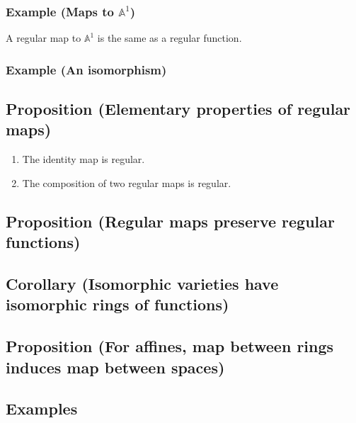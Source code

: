 \documentclass[11pt]{article}
\begin{document}
\subsubsection{Example (Maps to \(\mathbb A^1\))}
\label{sec:org48bd03f}
A regular map to \(\mathbb A^1\) is the same as a regular function.

\subsubsection{Example (An isomorphism)}
\label{sec:org9f56cb3}




\subsection{Proposition (Elementary properties of regular maps)}
\label{sec:org328916f}
\begin{enumerate}
\item The identity map is regular.
\item The composition of two regular maps is regular.
\end{enumerate}
\subsection{Proposition (Regular maps preserve regular functions)}
\label{sec:org241d60f}
\subsection{Corollary (Isomorphic varieties have isomorphic rings of functions)}
\label{sec:org267ba06}
\subsection{Proposition (For affines, map between rings induces map between spaces)}
\label{sec:org1e1e7f7}
\subsection{Examples}
\label{sec:org6722a9b}
\end{document}
